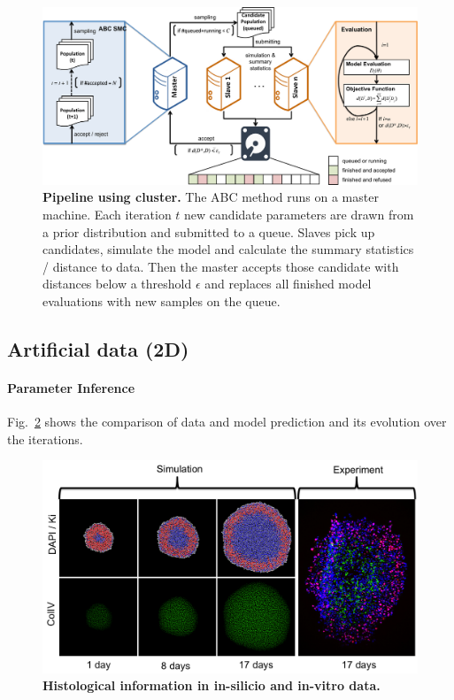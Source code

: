 \documentclass[10pt,letterpaper]{article}
\begin{document}
\begin{figure}[h]
\includegraphics[width=\textwidth]{Figures/Pipeline.pdf}
\caption{{\bf Pipeline using cluster.}
The ABC method runs on a master machine. Each iteration $t$ new candidate parameters are drawn from a prior distribution and submitted to a queue. Slaves pick up candidates, simulate the model and calculate the summary statistics / distance to data. Then the master accepts those candidate with distances below a threshold $\epsilon$ and replaces all finished model evaluations with new samples on the queue.}
\label{fig1}
\end{figure}

\subsection*{Artificial data (2D)}
\paragraph{Parameter Inference}
Fig.~\ref{fig2} shows the comparison of data and model prediction and its evolution over the iterations. 

\begin{figure}[!h]
\includegraphics[width=\textwidth]{Figures/SimulationSnapshots}
\caption{{\bf Histological information in in-silicio and in-vitro data.}
}
\label{fig2}
\end{figure}
\end{document}
